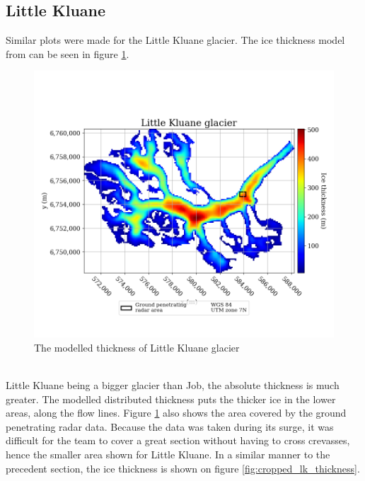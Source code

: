\documentclass[a4, 12pt]{article}
\begin{document}
\subsection{Little Kluane}
Similar plots were made for the Little Kluane glacier. The ice thickness model from \citeauthor{farinotti2019consensus} \citeyear{farinotti2019consensus} can be seen in figure \ref{fig:lk_thickness}.
\begin{figure}[h!]
\centering
\includegraphics[scale=0.4]{../job_kluane_maps/Little Kluane glacier_thickness.png}
\caption{The modelled thickness of Little Kluane glacier}
\label{fig:lk_thickness}
\end{figure}
\\
Little Kluane being a bigger glacier than Job, the absolute thickness is much greater. The modelled distributed thickness puts the thicker ice in the lower areas, along the flow lines. Figure \ref{fig:lk_thickness} also shows the area covered by the ground penetrating radar data. Because the data was taken during its surge, it was difficult for the team to cover a great section without having to cross crevasses, hence the smaller area shown for Little Kluane. In a similar manner to the precedent section, the ice thickness is shown on figure \ref{fig:cropped_lk_thickness}.
\end{document}
